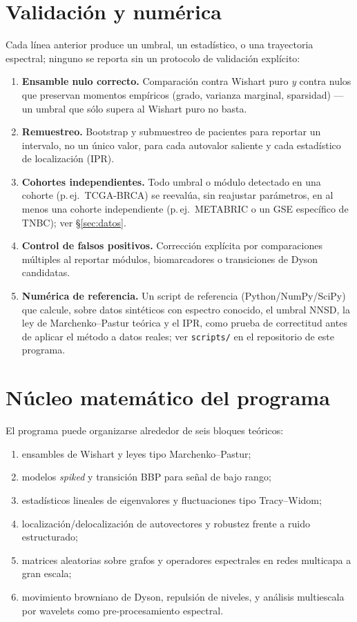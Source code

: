 \documentclass[11pt]{article}
\begin{document}
\section{Validación y numérica}
\label{sec:validacion}
Cada línea anterior produce un umbral, un estadístico, o una trayectoria espectral; ninguno se reporta sin un protocolo de validación explícito:
\begin{enumerate}[label=\arabic*.]
    \item \textbf{Ensamble nulo correcto.} Comparación contra Wishart puro \emph{y} contra nulos que preservan momentos empíricos (grado, varianza marginal, sparsidad) --- un umbral que sólo supera al Wishart puro no basta.
    \item \textbf{Remuestreo.} Bootstrap y submuestreo de pacientes para reportar un intervalo, no un único valor, para cada autovalor saliente y cada estadístico de localización (IPR).
    \item \textbf{Cohortes independientes.} Todo umbral o módulo detectado en una cohorte (p.\,ej.\ TCGA-BRCA) se reevalúa, sin reajustar parámetros, en al menos una cohorte independiente (p.\,ej.\ METABRIC o un GSE específico de TNBC); ver \S\ref{sec:datos}.
    \item \textbf{Control de falsos positivos.} Corrección explícita por comparaciones múltiples al reportar módulos, biomarcadores o transiciones de Dyson candidatas.
    \item \textbf{Numérica de referencia.} Un script de referencia (Python/NumPy/SciPy) que calcule, sobre datos sintéticos con espectro conocido, el umbral NNSD, la ley de Marchenko--Pastur teórica y el IPR, como prueba de correctitud antes de aplicar el método a datos reales; ver \texttt{scripts/} en el repositorio de este programa.
\end{enumerate}

\section{Núcleo matemático del programa}
El programa puede organizarse alrededor de seis bloques teóricos:
\begin{enumerate}[label=\arabic*.]
    \item ensambles de Wishart y leyes tipo Marchenko--Pastur;
    \item modelos \emph{spiked} y transición BBP para señal de bajo rango;
    \item estadísticos lineales de eigenvalores y fluctuaciones tipo Tracy--Widom;
    \item localización/delocalización de autovectores y robustez frente a ruido estructurado;
    \item matrices aleatorias sobre grafos y operadores espectrales en redes multicapa a gran escala;
    \item movimiento browniano de Dyson, repulsión de niveles, y análisis multiescala por wavelets como pre-procesamiento espectral.
\end{enumerate}
\end{document}
